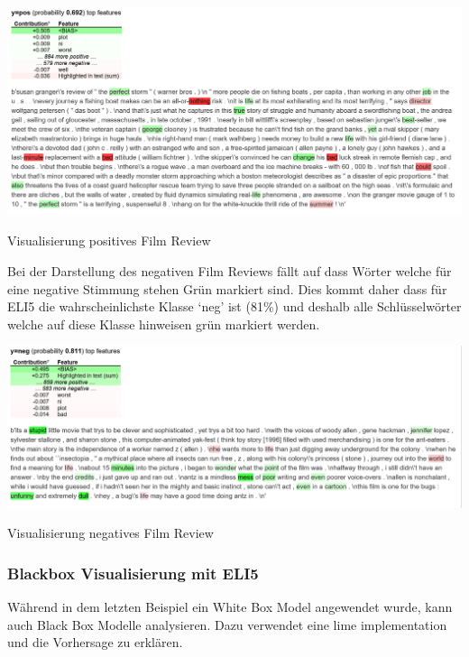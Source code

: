 \documentclass[
  12pt, %
  a4paper, %
  oneside, %
  openany, 
  numbers=noenddot, %
  BCOR=5mm, %
  parskip=half*, %
  thesis, %
]{bfhbook}
\begin{document}
\begin{center}
\begin{minipage}[t]{\linewidth}
\includegraphics[width=\textwidth]{Bilder/MovieReviews-SentimentClassification_1.PNG}
\caption{Visualisierung positives Film Review}
\end{minipage}
\end{center}

Bei der Darstellung des negativen Film Reviews fällt auf dass Wörter welche für eine negative Stimmung stehen Grün markiert sind. Dies kommt daher dass für ELI5 die wahrscheinlichste Klasse `neg' ist (81\%) und deshalb alle Schlüsselwörter welche auf diese Klasse hinweisen grün markiert werden.

\begin{center}
\begin{minipage}[t]{\linewidth}
\includegraphics[width=\textwidth]{Bilder/MovieReviews-SentimentClassification_2.PNG}
\caption{Visualisierung negatives Film Review}
\end{minipage}
\end{center}

\subsubsection*{Blackbox Visualisierung mit ELI5}
Während in dem letzten Beispiel ein White Box Model angewendet wurde, kann \cite{ELI5} auch Black Box Modelle analysieren. Dazu verwendet \cite{ELI5} eine \Gls{lime} implementation und die Vorhersage zu erklären.
\end{document}
